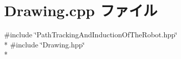\section{Drawing.\-cpp ファイル}
\label{_drawing_8cpp}
{\ttfamily \#include \char`\"{}Path\-Tracking\-And\-Induction\-Of\-The\-Robot.\-hpp\char`\"{}}\\*
{\ttfamily \#include \char`\"{}Drawing.\-hpp\char`\"{}}\\*
